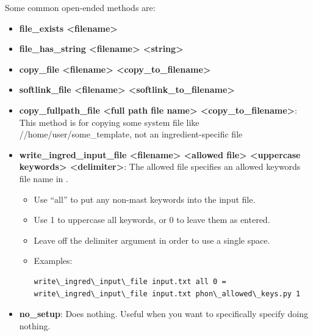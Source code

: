 \documentclass[letterpaper,10pt,english]{sphinxmanual}
\begin{document}
Some common open-ended methods are:
\begin{itemize}
\item {} 
\textbf{file\_exists \textless{}filename\textgreater{}}

\item {} 
\textbf{file\_has\_string \textless{}filename\textgreater{} \textless{}string\textgreater{}}

\item {} 
\textbf{copy\_file \textless{}filename\textgreater{} \textless{}copy\_to\_filename\textgreater{}}

\item {} 
\textbf{softlink\_file \textless{}filename\textgreater{} \textless{}softlink\_to\_filename\textgreater{}}

\item {} 
\textbf{copy\_fullpath\_file \textless{}full path file name\textgreater{} \textless{}copy\_to\_filename\textgreater{}}: This method is for copying some system file like //home/user/some\_template, not an ingredient-specific file

\item {} 
\textbf{write\_ingred\_input\_file \textless{}filename\textgreater{} \textless{}allowed file\textgreater{} \textless{}uppercase keywords\textgreater{} \textless{}delimiter\textgreater{}}: The allowed file specifies an allowed keywords file name in .
\begin{itemize}
\item {} 
Use ``all'' to put any non-mast keywords into the input file.

\item {} 
Use 1 to uppercase all keywords, or 0 to leave them as entered.

\item {} 
Leave off the delimiter argument in order to use a single space.

\item {} 
Examples:

\begin{Verbatim}[commandchars=\\\{\}]
write\_ingred\_input\_file input.txt all 0 =
write\_ingred\_input\_file input.txt phon\_allowed\_keys.py 1
\end{Verbatim}

\end{itemize}

\item {} 
\textbf{no\_setup}: Does nothing. Useful when you want to specifically specify doing nothing.


\end{itemize}
\end{document}
